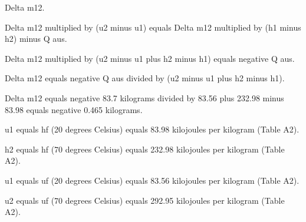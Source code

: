 Delta m12.  

Delta m12 multiplied by (u2 minus u1) equals Delta m12 multiplied by (h1 minus h2) minus Q aus.  

Delta m12 multiplied by (u2 minus u1 plus h2 minus h1) equals negative Q aus.  

Delta m12 equals negative Q aus divided by (u2 minus u1 plus h2 minus h1).  

Delta m12 equals negative 83.7 kilograms divided by 83.56 plus 232.98 minus 83.98 equals negative 0.465 kilograms.  

u1 equals hf (20 degrees Celsius) equals 83.98 kilojoules per kilogram (Table A2).  

h2 equals hf (70 degrees Celsius) equals 232.98 kilojoules per kilogram (Table A2).  

u1 equals uf (20 degrees Celsius) equals 83.56 kilojoules per kilogram (Table A2).  

u2 equals uf (70 degrees Celsius) equals 292.95 kilojoules per kilogram (Table A2).